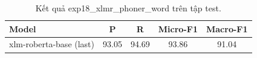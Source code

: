 \begin{table}[t]
\centering
\begin{tabular}{lcccc}
\hline
\textbf{Model} & \textbf{P} & \textbf{R} & \textbf{Micro-F1} & \textbf{Macro-F1} \\
\hline
xlm-roberta-base (last) & 93.05 & 94.69 & 93.86 & 91.04 \\
\hline
\end{tabular}
\caption{Kết quả exp18_xlmr_phoner_word trên tập test.}
\label{tab:main}
\end{table}